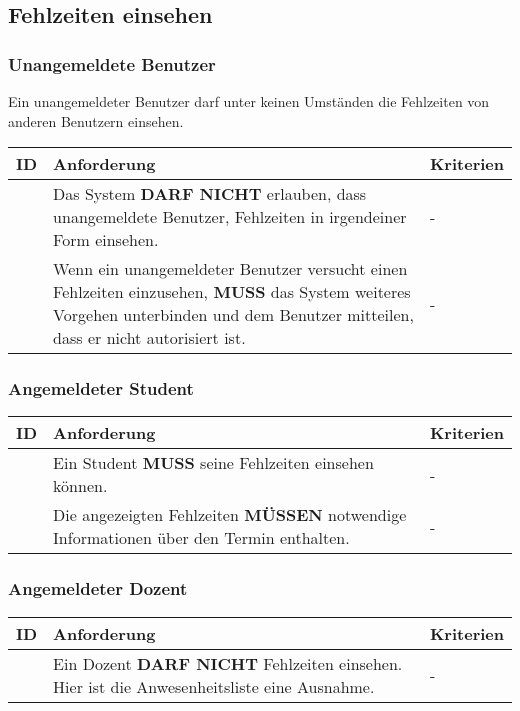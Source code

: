 \newpage

\subsection{Fehlzeiten einsehen}

\subsubsection{Unangemeldete Benutzer}
Ein unangemeldeter Benutzer darf unter keinen Umständen die Fehlzeiten von anderen Benutzern einsehen.

\vspace{12pt}

\begin{tabular} {|p{}|p{}|p{}|}
	\hline
	ID & Anforderung & Kriterien \\
	\hline
	\printfreqnr
	& Das System \textbf{DARF NICHT} erlauben, dass unangemeldete Benutzer, Fehlzeiten in irgendeiner Form einsehen. 
	& - \\
	\hline
	\printfreqnr
	& Wenn ein unangemeldeter Benutzer versucht einen Fehlzeiten einzusehen, \textbf{MUSS} das System weiteres Vorgehen unterbinden und dem Benutzer mitteilen, dass er nicht autorisiert ist.
	& - \\ 
	\hline
\end{tabular}

\vspace{12pt}

\subsubsection{Angemeldeter Student}
\begin{tabular} {|p{}|p{}|p{}|}
	\hline
	ID & Anforderung & Kriterien \\
	\hline
	\printfreqnr
	& Ein Student \textbf{MUSS} seine Fehlzeiten einsehen können. 
	& - \\
	\hline
	\printfreqnr
	& Die angezeigten Fehlzeiten \textbf{MÜSSEN} notwendige Informationen über den Termin enthalten.
	& - \\ 
	\hline
\end{tabular}

\vspace{12pt}

\subsubsection{Angemeldeter Dozent}
\begin{tabular} {|p{}|p{}|p{}|}
	\hline
	ID & Anforderung & Kriterien \\
	\hline
	\printfreqnr
	& Ein Dozent \textbf{DARF NICHT} Fehlzeiten einsehen. Hier ist die Anwesenheitsliste eine Ausnahme. 
	& - \\
	\hline
\end{tabular}

